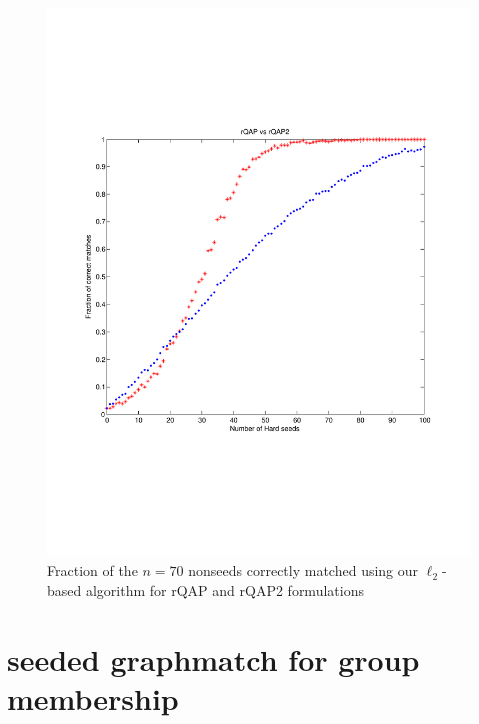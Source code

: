 \documentclass[12pt]{article}
\begin{document}
\begin{figure}
 \centering
  \caption{Fraction of the $n=70$ nonseeds correctly matched using our $\ell_2$-based algorithm for rQAP and rQAP2 formulations
 \label{figell2}}
 \includegraphics[width=1.2\textwidth]{rQAP_vs_rQAP2-alotmore.pdf}
\end{figure}

\section{seeded graphmatch for group membership}

\end{document}
